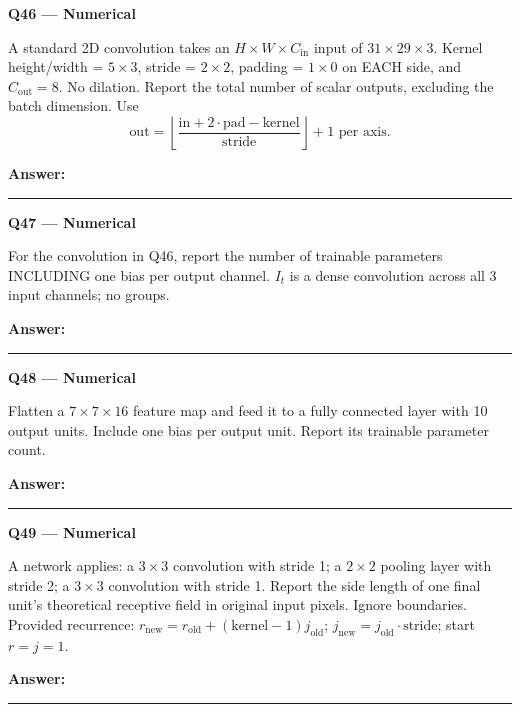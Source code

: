 \documentclass[11pt,a4paper]{article}
\begin{document}
\begin{minipage}{\linewidth}
\textbf{Q46 — Numerical}\par\smallskip
A standard 2D convolution takes an \(H\times W\times C_{\mathrm{in}}\) input of \(31\times29\times3\). Kernel height/\allowbreak{}width =\allowbreak{} \(5\times3\),\allowbreak{} stride =\allowbreak{} \(2\times2\),\allowbreak{} padding =\allowbreak{} \(1\times0\) on EACH side,\allowbreak{} and \(C_{\mathrm{out}}=8\). No dilation. Report the total number of scalar outputs,\allowbreak{} excluding the batch dimension. Use
\[\text{out}=\left\lfloor\frac{\text{in}+2\cdot\text{pad}-\text{kernel}}{\text{stride}}\right\rfloor+1\text{ per axis}.\]

\par\medskip\textbf{Answer:} \rule{55mm}{0.4pt}
\end{minipage}
\par\vspace{12pt}
\begin{minipage}{\linewidth}
\textbf{Q47 — Numerical}\par\smallskip
For the convolution in Q46,\allowbreak{} report the number of trainable parameters INCLUDING one bias per output channel. \(I_t\) is a dense convolution across all 3 input channels; no groups.
\par\medskip\textbf{Answer:} \rule{55mm}{0.4pt}
\end{minipage}
\par\vspace{12pt}
\begin{minipage}{\linewidth}
\textbf{Q48 — Numerical}\par\smallskip
Flatten a \(7\times7\times16\) feature map and feed it to a fully connected layer with 10 output units. Include one bias per output unit. Report its trainable parameter count.
\par\medskip\textbf{Answer:} \rule{55mm}{0.4pt}
\end{minipage}
\par\vspace{12pt}
\begin{minipage}{\linewidth}
\textbf{Q49 — Numerical}\par\smallskip
A network applies: a \(3\times3\) convolution with stride 1; a \(2\times2\) pooling layer with stride 2; a \(3\times3\) convolution with stride 1. Report the side length of one final unit's theoretical receptive field in original input pixels. Ignore boundaries. Provided recurrence: \(r_{\mathrm{new}}=r_{\mathrm{old}}+(\text{kernel}-1)j_{\mathrm{old}}\); \(j_{\mathrm{new}}=j_{\mathrm{old}}\cdot\text{stride}\); start \(r=j=1\).
\par\medskip\textbf{Answer:} \rule{55mm}{0.4pt}
\end{minipage}
\end{document}
